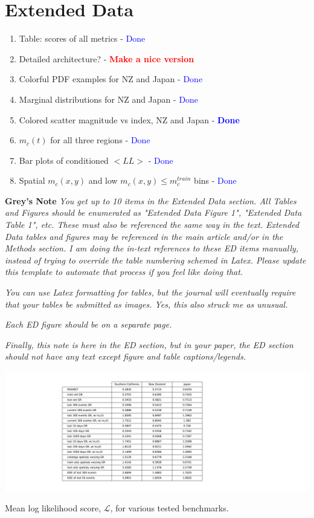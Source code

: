 \documentclass[pdflatex]{sn-jnl}
\begin{document}
\section*{Extended Data}
\begin{enumerate}
    \item Table: scores of all metrics - \textcolor{blue}{Done}
    \item Detailed architecture? - \textcolor{red}{\textbf{Make a nice version}}
    \item Colorful PDF examples for NZ and Japan - \textcolor{blue}{Done}
    \item Marginal distributions for NZ and Japan - \textcolor{blue}{Done}
    \item Colored scatter magnitude vs index, NZ and Japan - \textcolor{blue}{\textbf{Done}}
    \item $m_c(t)$ for all three regions - \textcolor{blue}{Done}
    \item Bar plots of conditioned $<LL>$ - \textcolor{blue}{Done}
    \item Spatial $m_c(x, y)$ and low $m_c(x, y) \leq m_c^{train}$ bins - \textcolor{blue}{Done}
\end{enumerate}

\textbf{Grey's Note} \textit{You get up to 10 items in the Extended Data section. All Tables and Figures should be enumerated as "Extended Data Figure 1", "Extended Data Table 1", etc. These must also be referenced the same way in the text. Extended Data tables and figures may be referenced in the main article and/or in the Methods section. I am doing the in-text references to these ED items manually, instead of trying to override the table numbering schemed in Latex. Please update this template to automate that process if you feel like doing that.}

\textit{You can use Latex formatting for tables, but the journal will eventually require that your tables be submitted as images. Yes, this also struck me as unusual.}

\textit{Each ED figure should be on a separate page.}

\textit{Finally, this note is here in the ED section, but in your paper, the ED section should not have any text except figure and table captions/legends.}

\newpage
\begin{table}[h!]
    \centering
    \includegraphics[width=1\textwidth]{figures/mean_ll_table.pdf}
    \caption{Mean log likelihood score, $\mathcal{L}$, for various tested benchmarks.}
    \label{tab:mean_ll_all_benchmarks}
\end{table}
\end{document}
